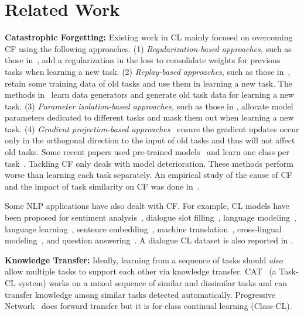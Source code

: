 \documentclass{article}
\begin{document}
\vspace{-2mm}
\section{Related Work}
\label{Sectionrelated.work}


\textbf{Catastrophic Forgetting:}
Existing work in CL mainly focused on overcoming CF using the following approaches. 
(1) \textit{Regularization-based approaches,} such as those in~\cite{Kirkpatrick2017overcoming,DBLP:conf/nips/LeeKJHZ17,Seff2017continual,zenke2017continual}, add a regularization in the loss to consolidate weights for previous tasks when learning a new task.
(2) \textit{Replay-based approaches}, such as those in~\cite{Rebuffi2017,Lopez2017gradient,Chaudhry2019ICLR,wang2020efficient}, retain some training data of old tasks and use them in learning a new task. 
The methods in~\cite{Shin2017continual,Kamra2017deep,Rostami2019ijcai,He2018overcoming} learn data generators and generate old task data for learning a new task.
(3) \textit{Parameter isolation-based approaches,} such as those in \cite{Serra2018overcoming,ke2020mixed,Mallya2017packnet,fernando2017pathnet}, allocate model parameters dedicated to different tasks and mask them out when learning a new task.
(4) \textit{Gradient projection-based approaches}~\cite{zeng2019continuous} ensure the gradient updates occur only in the orthogonal direction to the input of old tasks and thus will not affect old tasks. 
Some recent papers used pre-trained models~\cite{hu2021continual,ke2021Classic,ke2021adapting} and learn one class per task~\cite{hu2021continual}.
Tackling CF only deals with model deterioration. These methods perform worse than learning each task separately. An empirical study of the cause of CF and the impact of task similarity on CF was done in~\cite{ramasesh2021anatomy}. 

Some NLP applications have also dealt with CF. For example, CL models have been proposed for sentiment analysis~\cite{ke2021Classic,ke2021adapting,DBLP:conf/dasfaa/LvWLCZ19,qin2020using}, dialogue slot filling~\cite{shen-etal-2019-progressive}, 
language modeling~\cite{sun2020lamol,chuang2020lifelong}, language learning~\cite{li2019compositional}, sentence embedding~\cite{liu2019continual}, machine translation~\cite{khayrallah2018regularized}, cross-lingual modeling~\cite{liu2020exploring}, and question answering~\cite{greco2019psycholinguistics}. A dialogue CL dataset is also reported in \cite{madotto2020continual}. 


\textbf{Knowledge Transfer:}
Ideally, learning from a sequence of tasks should \textit{also} allow multiple tasks to support each other via knowledge transfer.
CAT~\cite{ke2020mixed} (a Task-CL system) works on a mixed sequence of similar and dissimilar tasks and can transfer knowledge among similar tasks detected automatically. 
Progressive Network~\cite{DBLP:journals/corr/RusuRDSKKPH16} does forward transfer but it is for class continual learning (Class-CL). 
\end{document}
